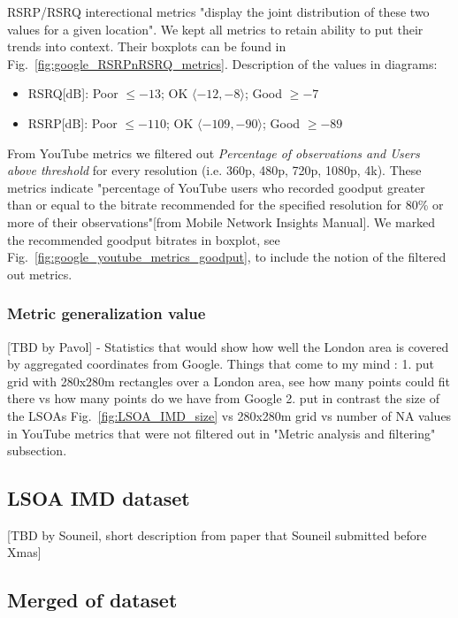 RSRP/RSRQ interectional metrics "display the joint distribution of these two values for a given location". We kept all metrics to retain ability to put their trends into context. Their boxplots can be found in Fig.~\ref{fig:google_RSRPnRSRQ_metrics}. Description of the values in diagrams:

\begin{itemize}[noitemsep]
\item RSRQ[dB]: Poor $\leq -13$; OK $\langle-12, -8\rangle$; Good $\geq -7$
\item RSRP[dB]: Poor $\leq -110$; OK $\langle-109, -90\rangle$; Good $\geq -89$
\end{itemize}

From YouTube metrics we filtered out \textit{Percentage of observations and Users above threshold} for every resolution (i.e. 360p, 480p, 720p, 1080p, 4k). These metrics indicate "percentage of YouTube users who recorded goodput greater than or equal to the bitrate recommended for the specified resolution for 80\% or more of their observations"[from Mobile Network Insights Manual]. We marked the recommended goodput bitrates in boxplot, see Fig.~\ref{fig:google_youtube_metrics_goodput}, to include the notion of the filtered out metrics.



\subsubsection{Metric generalization value}

[TBD by Pavol] - Statistics that would show how well the London area is covered by aggregated coordinates from Google. Things that come to my mind : 
1. put grid with 280x280m rectangles over a London area, see how many points could fit there vs how many points do we have from Google
2. put in contrast the size of the LSOAs Fig.~\ref{fig:LSOA_IMD_size} vs 280x280m grid vs number of NA values in YouTube metrics that were not filtered out in "Metric analysis and filtering" subsection.


\subsection{LSOA IMD dataset}

[TBD by Souneil, short description from paper that Souneil submitted before Xmas]

\subsection{Merged of dataset}

